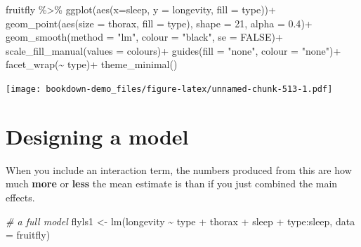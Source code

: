 \documentclass[
]{book}
\makeatletter
\newenvironment{Shaded}{\begin{snugshade}}{\end{snugshade}}
\newcommand{\AttributeTok}[1]{\textcolor[rgb]{0.77,0.63,0.00}{#1}}
\newcommand{\CommentTok}[1]{\textcolor[rgb]{0.56,0.35,0.01}{\textit{#1}}}
\newcommand{\ConstantTok}[1]{\textcolor[rgb]{0.00,0.00,0.00}{#1}}
\newcommand{\DecValTok}[1]{\textcolor[rgb]{0.00,0.00,0.81}{#1}}
\newcommand{\FloatTok}[1]{\textcolor[rgb]{0.00,0.00,0.81}{#1}}
\newcommand{\FunctionTok}[1]{\textcolor[rgb]{0.00,0.00,0.00}{#1}}
\newcommand{\NormalTok}[1]{#1}
\newcommand{\OtherTok}[1]{\textcolor[rgb]{0.56,0.35,0.01}{#1}}
\newcommand{\SpecialCharTok}[1]{\textcolor[rgb]{0.00,0.00,0.00}{#1}}
\newcommand{\StringTok}[1]{\textcolor[rgb]{0.31,0.60,0.02}{#1}}
\newenvironment{kframe}{%
\medskip{}
\setlength{\fboxsep}{.8em}
 \def\at@end@of@kframe{}%
 \ifinner\ifhmode%
  \def\at@end@of@kframe{\end{minipage}}%
  \begin{minipage}{\columnwidth}%
 \fi\fi%
 \def\FrameCommand##1{\hskip\@totalleftmargin \hskip-\fboxsep
 \colorbox{shadecolor}{##1}\hskip-\fboxsep
     \hskip-\linewidth \hskip-\@totalleftmargin \hskip\columnwidth}%
 \MakeFramed {\advance\hsize-\width
   \@totalleftmargin\z@ \linewidth\hsize
   \@setminipage}}%
 {\par\unskip\endMakeFramed%
 \at@end@of@kframe}
\newenvironment{block}[1]
  {
  \begin{itemize}
  \renewcommand{\labelitemi}{
    \raisebox{-.7\height}[0pt][0pt]{
      {\setkeys{Gin}{width=3em,keepaspectratio}\texttt{[image: images/\#1]}}
    }
  }
  \setlength{\fboxsep}{1em}
  \begin{kframe}
  \item
  }
  {
  \end{kframe}
  \end{itemize}
  }
\newenvironment{rmdnote}
  {\begin{block}{note}}
  {\end{block}}
\makeatother
\begin{document}
\begin{Shaded}
\begin{Highlighting}[]
\NormalTok{fruitfly }\SpecialCharTok{\%\textgreater{}\%} 
\FunctionTok{ggplot}\NormalTok{(}\FunctionTok{aes}\NormalTok{(}\AttributeTok{x=}\NormalTok{sleep, }\AttributeTok{y =}\NormalTok{ longevity, }\AttributeTok{fill =}\NormalTok{ type))}\SpecialCharTok{+}
  \FunctionTok{geom\_point}\NormalTok{(}\FunctionTok{aes}\NormalTok{(}\AttributeTok{size =}\NormalTok{ thorax,}
                 \AttributeTok{fill =}\NormalTok{ type),}
             \AttributeTok{shape =} \DecValTok{21}\NormalTok{,}
             \AttributeTok{alpha =} \FloatTok{0.4}\NormalTok{)}\SpecialCharTok{+}
  \FunctionTok{geom\_smooth}\NormalTok{(}\AttributeTok{method =} \StringTok{"lm"}\NormalTok{, }\AttributeTok{colour =} \StringTok{"black"}\NormalTok{,}
              \AttributeTok{se =} \ConstantTok{FALSE}\NormalTok{)}\SpecialCharTok{+}
  \FunctionTok{scale\_fill\_manual}\NormalTok{(}\AttributeTok{values =}\NormalTok{ colours)}\SpecialCharTok{+}
  \FunctionTok{guides}\NormalTok{(}\AttributeTok{fill =} \StringTok{"none"}\NormalTok{,}
         \AttributeTok{colour =} \StringTok{"none"}\NormalTok{)}\SpecialCharTok{+}
  \FunctionTok{facet\_wrap}\NormalTok{(}\SpecialCharTok{\textasciitilde{}}\NormalTok{ type)}\SpecialCharTok{+}
  \FunctionTok{theme\_minimal}\NormalTok{()}
\end{Highlighting}
\end{Shaded}

\texttt{[image: bookdown-demo\_files/figure-latex/unnamed-chunk-513-1.pdf]}

\hypertarget{designing-a-model-1}{%
\section{Designing a model}\label{designing-a-model-1}}

\begin{rmdnote}
When you include an interaction term, the numbers produced from this are
how much \textbf{more} or \textbf{less} the mean estimate is than if you
just combined the main effects.
\end{rmdnote}

\begin{Shaded}
\begin{Highlighting}[]
\CommentTok{\# a full model}
\NormalTok{flyls1 }\OtherTok{\textless{}{-}} \FunctionTok{lm}\NormalTok{(longevity }\SpecialCharTok{\textasciitilde{}}\NormalTok{ type }\SpecialCharTok{+}\NormalTok{ thorax }\SpecialCharTok{+}\NormalTok{ sleep }\SpecialCharTok{+}\NormalTok{ type}\SpecialCharTok{:}\NormalTok{sleep, }\AttributeTok{data =}\NormalTok{ fruitfly)}
\end{Highlighting}
\end{Shaded}
\end{document}
